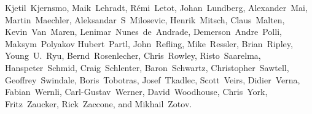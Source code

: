 {Kjetil~Kjernsmo,        %
Maik~Lehradt,           %
R\'emi~Letot,           %
Johan~Lundberg,         %
Alexander~Mai,          %
Martin~Maechler,        %
Aleksandar~S~Milosevic, %
Henrik~Mitsch,          %
Claus~Malten,           %
Kevin~Van~Maren,        %
Lenimar~Nunes~de~Andrade, %
Demerson~Andre~Polli,   %
Maksym~Polyakov         %
Hubert~Partl,           %
John~Refling,           %
Mike~Ressler,           %
Brian~Ripley,           %
Young~U.~Ryu,           %
Bernd~Rosenlecher,      %
Chris~Rowley,           %
Risto~Saarelma,         %
Hanspeter~Schmid,       %
Craig~Schlenter,        %
Baron~Schwartz,         %
Christopher~Sawtell,    %
Geoffrey~Swindale,      %
Boris~Tobotras,         %
Josef~Tkadlec,          %
Scott~Veirs,            %
Didier~Verna,           %
Fabian~Wernli,          %
Carl-Gustav~Werner,     %
David~Woodhouse,        %
Chris~York,             %
Fritz~Zaucker,          %
Rick~Zaccone,           %
and Mikhail~Zotov.      %

}




\pagebreak
\endinput
%

